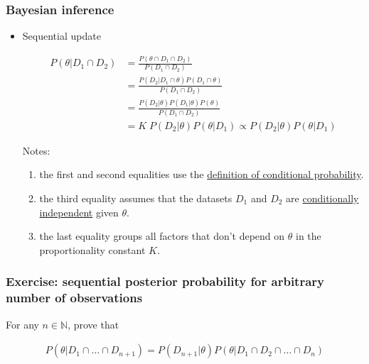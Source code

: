 \begin{frame}
    \frametitle{Bayesian inference}

    \scriptsize
    \begin{itemize}

        \item Sequential update

        \begin{align*}
            P(\theta|D_1\cap D_2)&=\frac{P(\theta\cap D_1\cap D_2)}{P(D_1\cap D_2)}\\
                                 &=\frac{P(D_2|D_1\cap\theta)P(D_1\cap\theta)}{P(D_1\cap D_2)}\\
                                 &=\frac{P(D_2|\theta)P(D_1|\theta)P(\theta)}{P(D_1\cap D_2)}\\
                                 &=K\;P(D_2|\theta)P(\theta|D_1)\propto P(D_2|\theta)P(\theta|D_1)
        \end{align*}

        Notes:

        \begin{enumerate}

            \item the first and second equalities use the
                \hyperlink{slide:defCondProb}{definition of conditional
                probability}.

            \item the third equality assumes that the datasets $D_1$ and $D_2$
                are
                \hyperlink{slide:conditionallyIndependentEvents}{conditionally
                independent} given $\theta$.

            \item the last equality groups all factors that don't depend on
                $\theta$ in the proportionality constant $K$.

        \end{enumerate}

    \end{itemize}
    \normalsize

\end{frame}

\begin{frame}
    \frametitle{Exercise: sequential posterior probability for arbitrary number of observations}

    For any $n\in\mathbb{N}$, prove that

    \begin{align*}
        P(\theta|D_1\cap\ldots\cap D_{n+1})=P(D_{n+1}|\theta)P(\theta|D_1\cap D_2\cap\ldots\cap D_n)
    \end{align*}

\end{frame}

